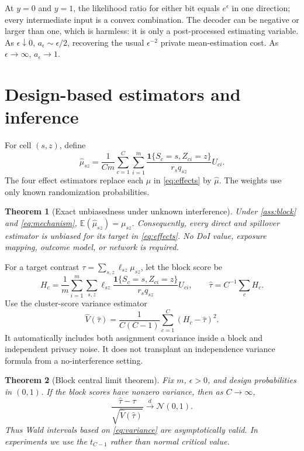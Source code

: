 \documentclass[11pt]{article}
\newtheorem{theorem}{Theorem}
\theoremstyle{definition}
\theoremstyle{remark}
\newcommand{\E}{\mathbb{E}}
\newcommand{\ind}{\mathbf{1}}
\newcommand{\doisig}{a_{\epsilon}}
\begin{document}
At $y=0$ and $y=1$, the likelihood ratio for either bit equals $e^{\epsilon}$ in one
direction; every intermediate input is a convex combination. The decoder can be negative or
larger than one, which is harmless: it is only a post-processed estimating variable. As
$\epsilon\downarrow0$, $\doisig\sim\epsilon/2$, recovering the usual $\epsilon^{-2}$ private
mean-estimation cost. As $\epsilon\to\infty$, $\doisig\to1$.

\section{Design-based estimators and inference}
\label{sec:estimation}

For cell $(s,z)$, define
\begin{equation}
  \widehat\mu_{sz}
  =\frac{1}{Cm}\sum_{c=1}^C\sum_{i=1}^m
    \frac{\ind\{S_c=s,Z_{ci}=z\}}
         {r_s q_{sz}}U_{ci}.
  \label{eq:ht}
\end{equation}
The four effect estimators replace each $\mu$ in \eqref{eq:effects} by
$\widehat\mu$. The weights use only known randomization probabilities.

\begin{theorem}[Exact unbiasedness under unknown interference]
\label{thm:unbiased}
Under \cref{ass:block} and \eqref{eq:mechanism}, $\E(\widehat\mu_{sz})=\mu_{sz}$.
Consequently, every direct and spillover estimator is unbiased for its target in
\eqref{eq:effects}. No DoI value, exposure mapping, outcome model, or network is required.
\end{theorem}

For a target contrast $\tau=\sum_{s,z}\ell_{sz}\mu_{sz}$, let the block score be
\begin{equation}
  H_c=\frac{1}{m}\sum_{i=1}^m\sum_{s,z}
  \ell_{sz}\frac{\ind\{S_c=s,Z_{ci}=z\}}{r_s q_{sz}}U_{ci},
  \qquad \widehat\tau=C^{-1}\sum_c H_c.
  \label{eq:blockscore}
\end{equation}
Use the cluster-score variance estimator
\begin{equation}
  \widehat V(\widehat\tau)
  =\frac{1}{C(C-1)}\sum_{c=1}^C(H_c-\widehat\tau)^2.
  \label{eq:variance}
\end{equation}
It automatically includes both assignment covariance inside a block and independent privacy
noise. It does not transplant an independence variance formula from a no-interference setting.

\begin{theorem}[Block central limit theorem]
\label{thm:clt}
Fix $m$, $\epsilon>0$, and design probabilities in $(0,1)$. If the block scores have
nonzero variance, then as $C\to\infty$,
\[
  \frac{\widehat\tau-\tau}{\sqrt{\widehat V(\widehat\tau)}}
  \overset{d}{\longrightarrow}\mathcal N(0,1).
\]
Thus Wald intervals based on \eqref{eq:variance} are asymptotically valid. In experiments we
use the $t_{C-1}$ rather than normal critical value.
\end{theorem}
\end{document}
